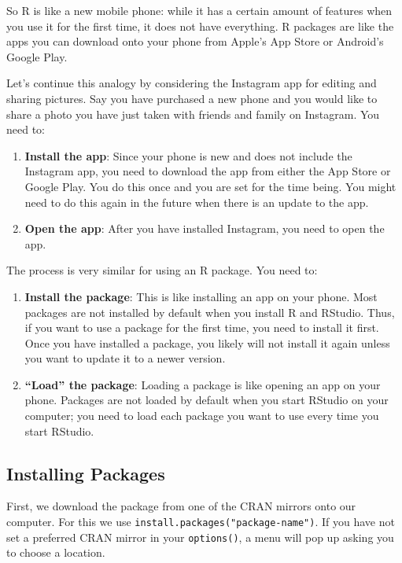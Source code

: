 \documentclass[]{book}
\providecommand{\tightlist}{%
  \setlength{\itemsep}{0pt}\setlength{\parskip}{0pt}}
\begin{document}
So R is like a new mobile phone: while it has a certain amount of
features when you use it for the first time, it does not have
everything. R packages are like the apps you can download onto your
phone from Apple's App Store or Android's Google Play.

Let's continue this analogy by considering the Instagram app for editing
and sharing pictures. Say you have purchased a new phone and you would
like to share a photo you have just taken with friends and family on
Instagram. You need to:

\begin{enumerate}
\def\labelenumi{\arabic{enumi}.}
\tightlist
\item
  \textbf{Install the app}: Since your phone is new and does not include
  the Instagram app, you need to download the app from either the App
  Store or Google Play. You do this once and you are set for the time
  being. You might need to do this again in the future when there is an
  update to the app.
\item
  \textbf{Open the app}: After you have installed Instagram, you need to
  open the app.
\end{enumerate}

The process is very similar for using an R package. You need to:

\begin{enumerate}
\def\labelenumi{\arabic{enumi}.}
\tightlist
\item
  \textbf{Install the package}: This is like installing an app on your
  phone. Most packages are not installed by default when you install R
  and RStudio. Thus, if you want to use a package for the first time,
  you need to install it first. Once you have installed a package, you
  likely will not install it again unless you want to update it to a
  newer version.
\item
  \textbf{``Load'' the package}: Loading a package is like opening an
  app on your phone. Packages are not loaded by default when you start
  RStudio on your computer; you need to load each package you want to
  use every time you start RStudio.
\end{enumerate}

\subsection{Installing Packages}\label{installing-packages}

First, we download the package from one of the CRAN mirrors onto our
computer. For this we use \texttt{install.packages("package-name")}. If
you have not set a preferred CRAN mirror in your \texttt{options()}, a
menu will pop up asking you to choose a location.
\end{document}
